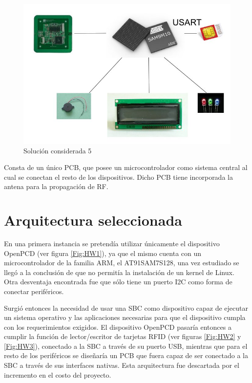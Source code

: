 \begin{itemize}
\begin{figure}[H]
\centering
  \begin{center}
  \includegraphics[scale=.25]{Imagenes/4.jpg} 
  \end{center}
  \caption{Solución considerada 5}\label{Fig:HW5} 
\end{figure}

Consta de un único PCB, que posee un microcontrolador como sistema central al cual se
conectan el resto de los dispositivos. Dicho PCB tiene incorporada la antena para la
propagación de RF.

\end{itemize}

\section{Arquitectura seleccionada}
En una primera instancia se pretendía utilizar únicamente el dispositivo OpenPCD (ver figura \ref{Fig:HW1}), ya que el mismo cuenta con un microcontrolador de la familia ARM, el AT91SAM7S128, una vez estudiado se llegó a la conclusión de que no permitía la instalación de un kernel de Linux. Otra desventaja encontrada fue que sólo tiene un puerto I2C como forma de conectar periféricos.

Surgió entonces la necesidad de usar una SBC como dispositivo capaz de ejecutar un sistema operativo y las aplicaciones necesarias para que el dispositivo cumpla con los requerimientos exigidos. El dispositivo OpenPCD pasaría entonces a cumplir la función de lector/escritor de tarjetas RFID (ver figuras \ref{Fig:HW2} y \ref{Fig:HW3}), conectado a la SBC a través de su puerto USB, mientras que para el resto de los periféricos se diseñaría un PCB que fuera capaz de ser conectado a la SBC a través de sus interfaces nativas. Esta arquitectura fue descartada por el incremento en el costo del proyecto.

